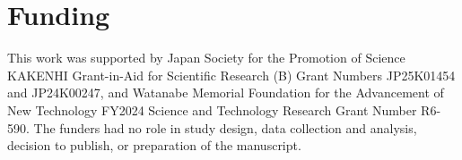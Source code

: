 \makeatletter
\def\@currentlabelname{Funding}%
\makeatother
\label{section:Funding}

\section*{Funding}
{}

This work was supported by Japan Society for the Promotion of Science KAKENHI Grant-in-Aid for Scientific Research (B) Grant Numbers JP25K01454 and JP24K00247, and Watanabe Memorial Foundation for the Advancement of New Technology FY2024 Science and Technology Research Grant Number R6-590. 
The funders had no role in study design, data collection and analysis, decision to publish, or preparation of the manuscript.